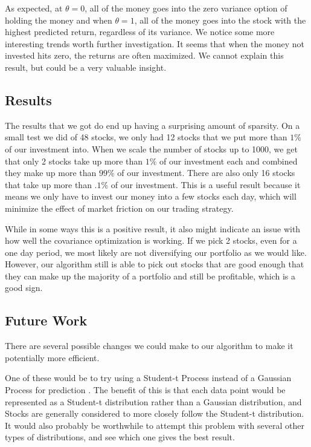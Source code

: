 \documentclass{article}
\begin{document}
As expected, at $\theta = 0$, all of the money goes into the zero variance option of holding the money and when $\theta = 1$, all of the money goes into the stock with the highest predicted return, regardless of its variance. We notice some more interesting trends worth further investigation. It seems that when the money not invested hits zero, the returns are often maximized. We cannot explain this result, but could be a very valuable insight.

\subsection{Results}

The results that we got do end up having a surprising amount of sparsity.  On a small test we did of 48 stocks, we only had 12 stocks that we put more than $1\%$ of our investment into.  When we scale the number of stocks up to 1000, we get that only 2 stocks take up more than $1\%$ of our investment each and combined they make up more than $99\%$ of our investment. There are also only 16 stocks that take up more than $.1\%$ of our investment.  This is a useful result because it means we only have to invest our money into a few stocks each day, which will minimize the effect of market friction on our trading strategy.

While in some ways this is a positive result, it also might indicate an issue with how well the covariance optimization is working.  If we pick 2 stocks, even for a one day period, we most likely are not diversifying our portfolio as we would like.  However, our algorithm still is able to pick out stocks that are good enough that they can make up the majority of a portfolio and still be profitable, which is a good sign.

\subsection{Future Work}

There are several possible changes we could make to our algorithm to make it potentially more efficient.  

One of these would be to try using a Student-t Process instead of a Gaussian Process for prediction \cite{student-t}.  The benefit of this is that each data point would be represented as a Student-t distribution rather than a Gaussian distribution, and Stocks are generally considered to more closely follow the Student-t distribution.  It would also probably be worthwhile to attempt this problem with several other types of distributions, and see which one gives the best result.  
\end{document}
